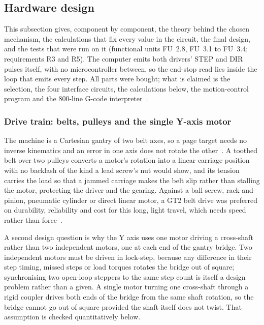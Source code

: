 \subsection{Hardware design}
\label{sec:gantry}

\begingroup
\setlength{\abovedisplayskip}{2pt}\setlength{\belowdisplayskip}{2pt}
\setlength{\abovedisplayshortskip}{1pt}\setlength{\belowdisplayshortskip}{1pt}

This subsection gives, component by component, the theory behind the chosen mechanism, the calculations that fix every value in the circuit, the final design, and the tests that were run on it (functional units FU~2.8, FU~3.1 to FU~3.4; requirements R3 and R5). The computer emits both drivers' STEP and DIR pulses itself, with no microcontroller between, so the end-stop read lies inside the loop that emits every step. All parts were bought; what is claimed is the selection, the four interface circuits, the calculations below, the motion-control program and the 800-line G-code interpreter~\cite{iso6983}.

\subsubsection{Drive train: belts, pulleys and the single Y-axis motor}
\label{sec:gan-mech}

The machine is a Cartesian gantry of two belt axes, so a page target needs no inverse kinematics and an error in one axis does not rotate the other~\cite{teikari2016}. A toothed belt over two pulleys converts a motor's rotation into a linear carriage position with no backlash of the kind a lead screw's nut would show, and its tension carries the load so that a jammed carriage makes the belt slip rather than stalling the motor, protecting the driver and the gearing. Against a ball screw, rack-and-pinion, pneumatic cylinder or direct linear motor, a GT2 belt drive was preferred on durability, reliability and cost for this long, light travel, which needs speed rather than force~\cite{iqs2024}.

A second design question is why the Y axis uses one motor driving a cross-shaft rather than two independent motors, one at each end of the gantry bridge. Two independent motors must be driven in lock-step, because any difference in their step timing, missed steps or load torques rotates the bridge out of square; synchronising two open-loop steppers to the same step count is itself a design problem rather than a given. A single motor turning one cross-shaft through a rigid coupler drives both ends of the bridge from the same shaft rotation, so the bridge cannot go out of square provided the shaft itself does not twist. That assumption is checked quantitatively below.

